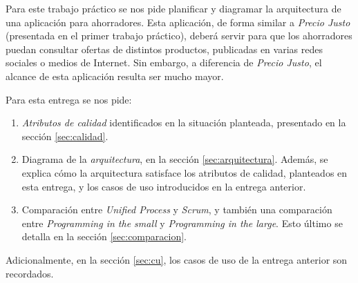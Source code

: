 Para este trabajo práctico se nos pide planificar y diagramar la arquitectura de una aplicación para ahorradores. Esta aplicación, de forma similar a \emph{Precio Justo} (presentada en el primer trabajo práctico), deberá servir para que los ahorradores puedan consultar ofertas de distintos productos, publicadas en varias redes sociales o medios de Internet. Sin embargo, a diferencia de \emph{Precio Justo}, el alcance de esta aplicación resulta ser mucho mayor. 

Para esta entrega se nos pide:
\begin{enumerate}
	\item \emph{Atributos de calidad} identificados en la situación planteada, presentado en la sección \ref{sec:calidad}.
	\item Diagrama de la \emph{arquitectura}, en la sección \ref{sec:arquitectura}. Además, se explica cómo la arquitectura satisface los atributos de calidad, planteados en esta entrega, y los casos de uso introducidos en la entrega anterior.
	\item Comparación entre \emph{Unified Process} y \emph{Scrum}, y también una comparación entre \emph{Programming in the small} y \emph{Programming in the large}. Esto último se detalla en la sección \ref{sec:comparacion}.
\end{enumerate}

Adicionalmente, en la sección \ref{sec:cu}, los casos de uso de la entrega anterior son recordados.

